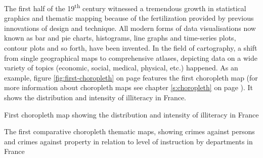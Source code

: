 The first half of the 19\textsuperscript{th} century witnessed a tremendous growth in statistical graphics and thematic mapping because of the fertilization provided by previous innovations of design and technique. All modern forms of data visualisations now known as bar and pie charts, histograms, line graphs and time-series plots, contour plots and so forth, have been invented. In the field of cartography, a shift from single geographical maps to comprehensive atlases, depicting data on a wide variety of topics (economic, social, medical, physical, etc.) happened. As an example, figure \ref{fig:first-choropleth} on page \pageref{fig:first-choropleth} features the first choropleth map (for more information about choropleth maps see chapter \ref{s:choropleth} on page \pageref{s:choropleth}). It shows the distribution and intensity of illiteracy in France.




\caption[
    First choropleth map showing the distribution and intensity of illiteracy in France, Urldate: 07.2016 \newline
\small\texttt{\url{http://datavis.ca/milestones//admin/uploads/images/dupin.gif}}
]{First choropleth map showing the distribution and intensity of illiteracy in France}
\label{fig:first-choropleth}

\caption[
    The first comparative choropleth thematic maps, showing crimes against persons and crimes against property in relation to level of instruction by departments in France, Urldate: 07.2016 \newline
\small\texttt{\url{http://datavis.ca/milestones//admin/uploads/images/guerry/guerry-balbi-600s.jpg}}
]{The first comparative choropleth thematic maps, showing crimes against persons and crimes against property in relation to level of instruction by departments in France}



